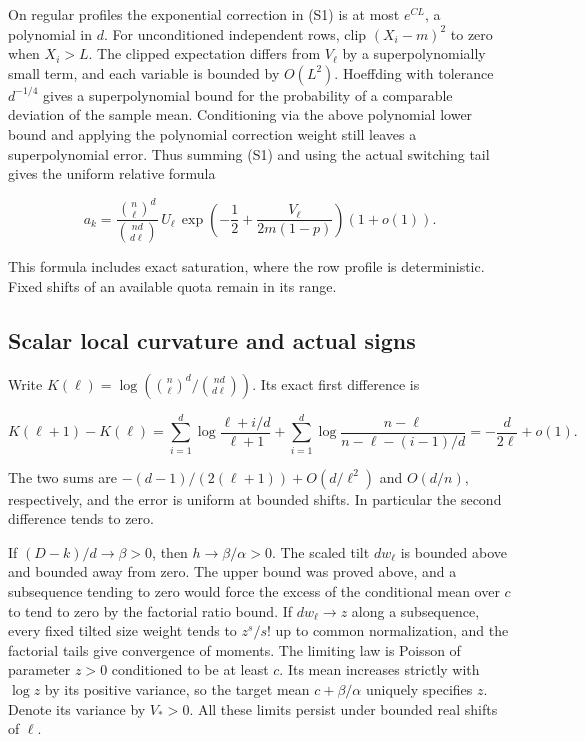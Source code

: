 On regular profiles the exponential correction in (S1) is at most $e^{CL}$, a polynomial in $d$. For unconditioned independent rows, clip $(X_i-m)^2$ to zero when $X_i>L$. The clipped expectation differs from $V_\ell$ by a superpolynomially small term, and each variable is bounded by $O(L^2)$. Hoeffding with tolerance $d^{-1/4}$ gives a superpolynomial bound for the probability of a comparable deviation of the sample mean. Conditioning via the above polynomial lower bound and applying the polynomial correction weight still leaves a superpolynomial error. Thus summing (S1) and using the actual switching tail gives the uniform relative formula

\begin{equation}
a_k=\frac{\binom n\ell^d}{\binom{nd}{d\ell}}\,
U_\ell\,
\exp\left(-\frac12+\frac{V_\ell}{2m(1-p)}\right)(1+o(1)).
\tag{S2}
\end{equation}

This formula includes exact saturation, where the row profile is deterministic. Fixed shifts of an available quota remain in its range.

\subsection{Scalar local curvature and actual signs}

Write $K(\ell)=\log(\binom n\ell^d/\binom{nd}{d\ell})$. Its exact first difference is

\begin{equation}
K(\ell+1)-K(\ell)
=\sum_{i=1}^d\log\frac{\ell+i/d}{\ell+1}
+\sum_{i=1}^d\log\frac{n-\ell}{n-\ell-(i-1)/d}
=-\frac{d}{2\ell}+o(1).
\tag{S3}
\end{equation}

The two sums are $-(d-1)/(2(\ell+1))+O(d/\ell^2)$ and $O(d/n)$, respectively, and the error is uniform at bounded shifts. In particular the second difference tends to zero.

If $(D-k)/d\to\beta>0$, then $h\to\beta/\alpha>0$. The scaled tilt $d w_\ell$ is bounded above and bounded away from zero. The upper bound was proved above, and a subsequence tending to zero would force the excess of the conditional mean over $c$ to tend to zero by the factorial ratio bound. If $d w_\ell\to z$ along a subsequence, every fixed tilted size weight tends to $z^s/s!$ up to common normalization, and the factorial tails give convergence of moments. The limiting law is Poisson of parameter $z>0$ conditioned to be at least $c$. Its mean increases strictly with $\log z$ by its positive variance, so the target mean $c+\beta/\alpha$ uniquely specifies $z$. Denote its variance by $V_*>0$. All these limits persist under bounded real shifts of $\ell$.

